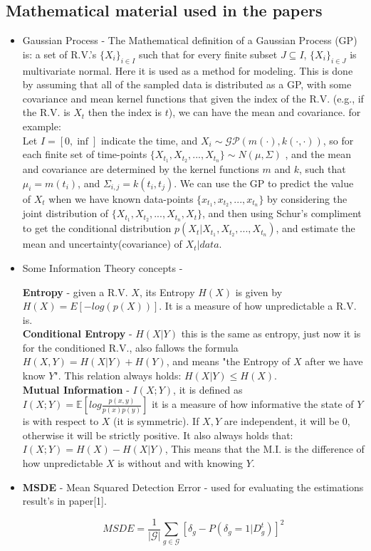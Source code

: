 \documentclass{article}
\begin{document}
	\subsection{Mathematical material used in the papers}
	\begin{itemize}
		\item Gaussian Process - The Mathematical definition of a Gaussian Process (GP) is:
		 a set of R.V.'s $\{X_i\}_{i \in I}$ such that for every finite subset $J \subseteq I$, $\{X_i\}_{i \in J}$ is multivariate normal.
		 Here it is used as a method for modeling. This is done by assuming that all of the sampled data is distributed as a GP, with some covariance and mean kernel functions that given the index of the R.V. 
		 (e.g., if the R.V. is $X_t$ then the index is $t$), we can have the mean and covariance. for example: \\
		 Let $I=[0,\inf]$ indicate the time, and ${X_i} \sim \mathcal{GP}(m(\cdot), k(\cdot,\cdot))$, so for each finite set of time-points
		 $\{X_{t_1},X_{t_2},...,X_{t_n}\} \sim N(\mu,\Sigma)$ , and the mean and covariance are determined by the kernel functions 
		 $m$ and $k$, such that $\mu_i = m(t_i)$, and $\Sigma_{i,j} = k(t_i, t_j)$. We can use the GP to predict the value of $X_t$ when we have known data-points $\{x_{t_1},x_{t_2},...,x_{t_n}\}$  by considering the joint distribution of $\{X_{t_1},X_{t_2},...,X_{t_n},X_t\}$, 
		 and then using Schur's compliment to get the conditional distribution $p(X_t|X_{t_1},X_{t_2},...,X_{t_n})$, and estimate the mean and uncertainty(covariance) of $X_t|data$.
		\item Some Information Theory concepts - 
		
		\textbf{Entropy} - given a R.V. $X$, its Entropy $H(X)$ is given by $H(X)=E[-log(p(X))]$. It is a measure of how unpredictable a R.V. is. \\ 
		
		\textbf{Conditional Entropy} - $H(X|Y)$  this is the same as entropy, just now it is for the conditioned R.V., also fallows the formula $H(X,Y)=H(X|Y) + H(Y)$, and means "the Entropy of $X$ after we have know $Y$".
		This relation always holds: $H(X|Y) \leq H(X)$. \\
		  
		\textbf{Mutual Information} - $I(X;Y)$, it is defined as $I(X;Y)=\mathbb{E}\left[log\frac{p(x,y)}{p(x)p(y)}\right]$ it is  a measure of how informative the state of $Y$ is with respect to $X$ (it is symmetric). If $X,Y$ are independent, it will be 0, otherwise it will be strictly positive.
		It also always holds that: $I(X;Y)=H(X)-H(X|Y)$, This means that the M.I. is the difference of how unpredictable $X$ is without and with knowing $Y$.  
		
		\item \textbf{MSDE} - Mean Squared Detection Error - used for evaluating the estimations result's in paper[1].
		
		$$MSDE = \frac{1}{|\mathcal{G}|}\sum_{g \in \mathcal{G}}[\delta_g - P(\delta_g = 1|D_g^t)]^2 $$		
	\end{itemize}
	
\end{document}
